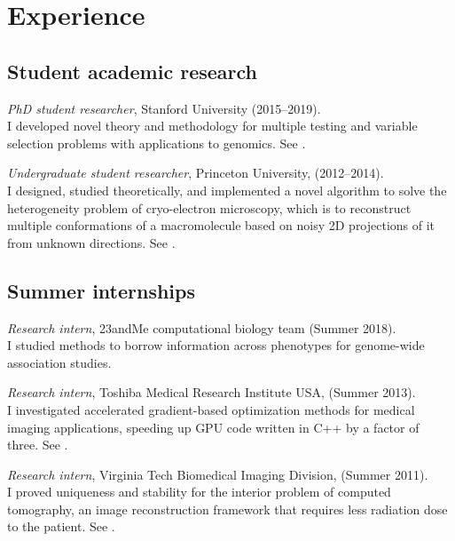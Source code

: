 \documentclass[letterpaper]{article}
\newenvironment{itemizenob}{
  \begin{list}{}{
    \setlength{\leftmargin}{1.5em}
  }
}{
  \end{list}
}
\begin{document}
\section*{Experience}

\subsection*{Student academic research}
\begin{itemizenob}\addtolength{\itemsep}{-0.2\baselineskip}
\item {\em PhD student researcher}, Stanford University (2015--2019). \\ I developed novel theory and methodology for multiple testing and variable selection problems with applications to genomics. See \cite{KS18, KR18, KetB18}.
\item {\em Undergraduate student researcher}, Princeton University, (2012--2014). \\ I designed, studied theoretically, and implemented a novel algorithm to solve the heterogeneity problem of cryo-electron microscopy, which is to reconstruct multiple conformations of a macromolecule based on noisy 2D projections of it from unknown directions. See \cite{KetS15, AetS15}.
\end{itemizenob}

\subsection*{Summer internships}
\begin{itemizenob}\addtolength{\itemsep}{-0.2\baselineskip}
\item {\em Research intern}, 23andMe computational biology team (Summer 2018). \\ I studied methods to borrow information across phenotypes for genome-wide association studies.
\item {\em Research intern}, Toshiba Medical Research Institute USA, (Summer 2013). \\ I investigated accelerated gradient-based optimization methods for medical imaging applications, 
speeding up GPU code written in C++ by a factor of three. See \cite{KetZ14}.
\item {\em Research intern}, Virginia Tech Biomedical Imaging Division, (Summer 2011).  \\
I proved uniqueness and stability for the interior problem of computed tomography, an image reconstruction framework that requires less radiation dose to the patient. See \cite{KKW12}.
\end{itemizenob}
\end{document}
